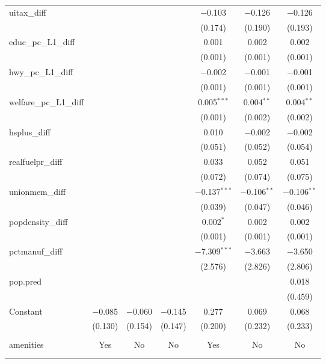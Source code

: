 \begin{table}[!htbp]
\begin{tabular}{@{\extracolsep{5pt}}lcccccc}
  uitax\_diff &  &  &  & $-$0.103 & $-$0.126 & $-$0.126 \\ 
  &  &  &  & (0.174) & (0.190) & (0.193) \\ 
  educ\_pc\_L1\_diff &  &  &  & 0.001 & 0.002 & 0.002 \\ 
  &  &  &  & (0.001) & (0.001) & (0.001) \\ 
  hwy\_pc\_L1\_diff &  &  &  & $-$0.002 & $-$0.001 & $-$0.001 \\ 
  &  &  &  & (0.001) & (0.001) & (0.001) \\ 
  welfare\_pc\_L1\_diff &  &  &  & 0.005$^{***}$ & 0.004$^{**}$ & 0.004$^{**}$ \\ 
  &  &  &  & (0.001) & (0.002) & (0.002) \\ 
  hsplus\_diff &  &  &  & 0.010 & $-$0.002 & $-$0.002 \\ 
  &  &  &  & (0.051) & (0.052) & (0.054) \\ 
  realfuelpr\_diff &  &  &  & 0.033 & 0.052 & 0.051 \\ 
  &  &  &  & (0.072) & (0.074) & (0.075) \\ 
  unionmem\_diff &  &  &  & $-$0.137$^{***}$ & $-$0.106$^{**}$ & $-$0.106$^{**}$ \\ 
  &  &  &  & (0.039) & (0.047) & (0.046) \\ 
  popdensity\_diff &  &  &  & 0.002$^{*}$ & 0.002 & 0.002 \\ 
  &  &  &  & (0.001) & (0.001) & (0.001) \\ 
  pctmanuf\_diff &  &  &  & $-$7.309$^{***}$ & $-$3.663 & $-$3.650 \\ 
  &  &  &  & (2.576) & (2.826) & (2.806) \\ 
  pop.pred &  &  &  &  &  & 0.018 \\ 
  &  &  &  &  &  & (0.459) \\ 
  Constant & $-$0.085 & $-$0.060 & $-$0.145 & 0.277 & 0.069 & 0.068 \\ 
  & (0.130) & (0.154) & (0.147) & (0.200) & (0.232) & (0.233) \\ 
 \hline \\[-1.8ex] 
amenities & Yes & No & No & Yes & No & No \\ 
\hline \\[-1.8ex] 
\hline 
\hline \\[-1.8ex] 
\end{tabular} 
\end{table} 
